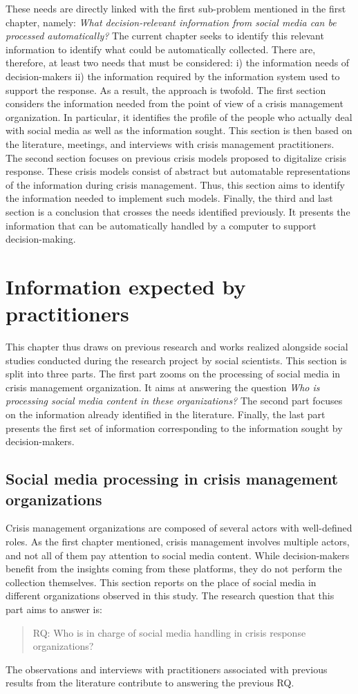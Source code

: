 These needs are directly linked with the first sub-problem mentioned in the first chapter, namely: \emph{What decision-relevant information from social media can be processed automatically?}
The current chapter seeks to identify this relevant information to identify what could be automatically collected.
There are, therefore, at least two needs that must be considered: i) the information needs of decision-makers ii) the information required by the information system used to support the response.
As a result, the approach is twofold.
The first section considers the information needed from the point of view of a crisis management organization.
In particular, it identifies the profile of the people who actually deal with social media as well as the information sought.
This section is then based on the literature, meetings, and interviews with crisis management practitioners.
The second section focuses on previous crisis models proposed to digitalize crisis response.
These crisis models consist of abstract but automatable representations of the information during crisis management.
Thus, this section aims to identify the information needed to implement such models.
Finally, the third and last section is a conclusion that crosses the needs identified previously.
It presents the information that can be automatically handled by a computer to support decision-making.

\section{Information expected by practitioners}
This chapter thus draws on previous research and works realized alongside social studies conducted during the research project by social scientists.
This section is split into three parts.
The first part zooms on the processing of social media in crisis management organization.
It aims at answering the question \textit{Who is processing social media content in these organizations?}
The second part focuses on the information already identified in the literature.
Finally, the last part presents the first set of information corresponding to the information sought by decision-makers.

\subsection{Social media processing in crisis management organizations}
Crisis management organizations are composed of several actors with well-defined roles.
As the first chapter mentioned, crisis management involves multiple actors, and not all of them pay attention to social media content.
While decision-makers benefit from the insights coming from these platforms, they do not perform the collection themselves.
This section reports on the place of social media in different organizations observed in this study.
The research question that this part aims to answer is:
\blockquote{RQ: Who is in charge of social media handling in crisis response organizations?}
The observations and interviews with practitioners associated with previous results from the literature contribute to answering the previous RQ.

